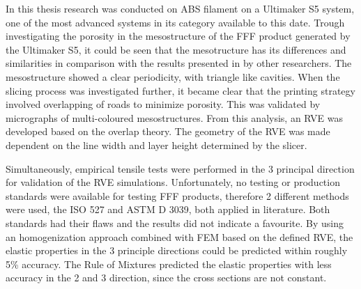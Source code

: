 In this thesis research was conducted on ABS filament on a Ultimaker S5 system, one of the most advanced systems in its category available to this date. Trough investigating the porosity in the mesostructure of the FFF product generated by the Ultimaker S5, it could be seen that the mesotructure has its differences and similarities in comparison with the results presented in by other researchers. The mesostructure showed a clear periodicity, with triangle like cavities. When the slicing process was investigated further, it became clear that the printing strategy involved overlapping of roads to minimize porosity. This was validated by micrographs of multi-coloured mesostructures. From this analysis, an RVE was developed based on the overlap theory. The geometry of the RVE was made dependent on the line width and layer height determined by the slicer. 

Simultaneously, empirical tensile tests were performed in the 3 principal direction for validation of the RVE simulations. Unfortunately, no testing or production standards were available for testing FFF products, therefore 2 different methods were used, the ISO 527 and ASTM D 3039, both applied in literature. Both standards had their flaws and the results did not indicate a favourite.  
By using an homogenization approach combined with FEM based on the defined RVE, the elastic properties in the 3 principle directions could be predicted within roughly 5\% accuracy. The Rule of Mixtures predicted the elastic properties with less accuracy in the 2 and 3 direction, since the cross sections are not constant. 

